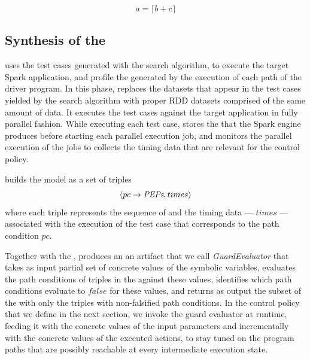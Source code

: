 \[a = \lceil b + c\rceil\]

\subsection{Synthesis of the \model}

\approach uses the test cases generated with the search algorithm, to execute the target Spark application, and profile the \plan generated by the execution of each path of the driver program. In this phase, \approach replaces the \sparsedata datasets that appear in the test cases yielded by the search algorithm with proper RDD datasets comprised of the same amount of data. It executes the test cases against the target application in fully parallel fashion. While executing each test case, \approach stores the \plan that the Spark engine produces before starting each parallel execution job, and monitors the parallel execution of the jobs to collects the timing data that are relevant for  the control policy. 

\approach builds the \model model as a set of triples \[\langle pc \rightarrow \textit{PEPs}, times\rangle\] where each triple represents the sequence of \plans  and the timing data --- $times$ --- associated with the execution of the test case that corresponds to the path condition $pc$. 

Together with the \model, \approach produces an an artifact that we call \textit{GuardEvaluator} that takes as input partial set of concrete values of the symbolic variables, evaluates the path conditions of  triples in the \model against these values, identifies which path conditions evaluate to $false$ for these values, and  
returns as output the subset of the \model with only the triples with non-falsified path conditions. In the control policy that we define in the next section, we invoke the guard evaluator at runtime, feeding it with the concrete values of the input parameters and incrementally with the concrete values of the executed actions, to stay tuned on the program paths that are possibly reachable at every intermediate execution state. 


